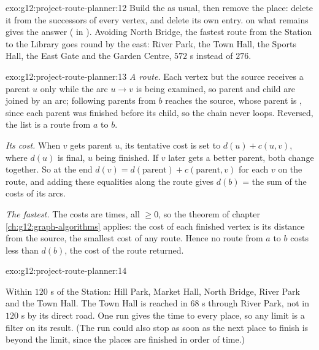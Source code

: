 \begin{solution}{exo:g12:project-route-planner:12}
Build the  as usual, then remove the place: delete it from the successors of every vertex, and delete its own
entry.  on what remains gives the answer ( in ).
Avoiding North Bridge, the fastest route from the Station to the Library goes round by the east: River Park, the Town
Hall, the Sports Hall, the East Gate and the Garden Centre, $572$ s instead of $276$.
\end{solution}

\begin{solution}{exo:g12:project-route-planner:13}
\emph{A route.} Each vertex but the source receives a parent $u$ only while the arc $u \to v$ is being examined, so
parent and child are joined by an arc; following parents from $b$ reaches the source, whose parent is ,
since each parent was finished before its child, so the chain never loops. Reversed, the list is a route from $a$ to $b$.

\emph{Its cost.} When $v$ gets parent $u$, its tentative cost is set to $d(u) + c(u, v)$, where $d(u)$ is final, $u$
being finished. If $v$ later gets a better parent, both change together. So at the end $d(v) = d(\text{parent}) +
c(\text{parent}, v)$ for each $v$ on the route, and adding these equalities along the route gives $d(b)$ = the sum of
the costs of its arcs.

\emph{The fastest.} The costs are times, all $\ge 0$, so the theorem of chapter \ref{ch:g12:graph-algorithms} applies:
the cost of each finished vertex is its distance from the source, the smallest cost of any route. Hence no route from
$a$ to $b$ costs less than $d(b)$, the cost of the route returned.
\end{solution}

\begin{solution}{exo:g12:project-route-planner:14}
\smallskip\noindent\hspace*{2em}

\noindent\hspace*{4em}

\noindent\hspace*{4em}

\noindent\hspace*{11em}

\smallskip\noindent Within $120$ s of the Station: Hill Park, Market Hall, North Bridge, River Park and the Town Hall.
The Town Hall is reached in $68$ s through River Park, not in $120$ s by its direct road. One run gives the time to
every place, so any limit is a filter on its result. (The run could also stop as soon as the next place to finish is
beyond the limit, since the places are finished in order of time.)
\end{solution}

